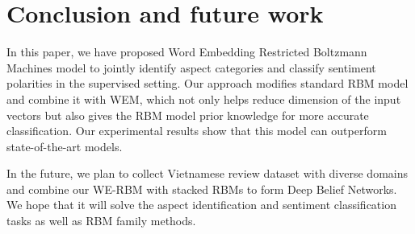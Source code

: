 \section{Conclusion and future work} \label{conclusion}

In this paper, we have proposed Word Embedding Restricted Boltzmann Machines model to jointly identify aspect categories and classify sentiment polarities in the supervised setting.
Our approach modifies standard RBM model and combine it with WEM, which not only helps reduce dimension of the input vectors but also gives the RBM model prior knowledge for more accurate classification.
Our experimental results show that this model can outperform state-of-the-art models.

In the future, we plan to collect Vietnamese review dataset with diverse domains and combine our WE-RBM with stacked RBMs to form Deep Belief Networks.
We hope that it will solve the aspect identification and sentiment classification tasks as well as RBM family methods.